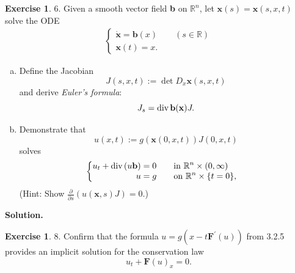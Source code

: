 \message{ !name(PDE-hw6-21935004-\unexpanded{谭焱}.tex)}\documentclass[a4paper]{book}
\newenvironment{solution}%
{\noindent\textbf{Solution.}}%
{\qedhere}
\numberwithin{equation}{chapter}
\theoremstyle{definition}
\newtheorem{exc}[exm]{Exercise}
\begin{document}
\begin{exc}
  6.  Given a smooth vector field \textbf{b} on $\mathbb{R}^n$, let $\mathbf{x}(s) = \mathbf{x}(s,x,t)$ solve the ODE
  \begin{eqnarray} \nonumber
    \begin{cases}
      \dot{\mathbf{x}} = \mathbf{b}(x) \qquad (s \in \mathbb{R}) \\
      \mathbf{x}(t) = x.
    \end{cases}
  \end{eqnarray}
  \begin{enumerate}[(a)]
  \item Define the Jacobian
    \begin{equation}
      \label{eq:6:5:1}
      J(s,x,t) := \det D_x\mathbf{x}(s,x,t)
    \end{equation}
    and derive \textit{Euler's formula}:
    \begin{equation}
      \label{eq:6:5:2}
      J_s = \textmd{div}\, \mathbf{b(x)}J.
    \end{equation}

  \item Demonstrate that
    \begin{equation}
      \label{eq:6:5:3}
      u(x,t) := g(\mathbf{x}(0,x,t))J(0,x,t)
    \end{equation}
    solves
    \begin{eqnarray}
      \label{eq:6:5:4}
      \begin{cases}
        \begin{aligned}
        u_t + \textmd{div}\,(u\mathbf{b}) &= 0 \qquad \textmd{in } \mathbb{R}^n \times (0,\infty) \\
        u &= g \qquad \textmd{on } \mathbb{R}^n \times \{t = 0\},
        \end{aligned}
      \end{cases}
    \end{eqnarray}
    (Hint: Show $\frac{\partial}{\partial s}(u(\mathbf{x},s)J) = 0$.)
  \end{enumerate}
\end{exc}

\begin{solution}
  
\end{solution}

\begin{exc}
  8.  Confirm that the formula $u = g(x - t \mathbf{F}^\prime (u))$ from 3.2.5 provides an implicit solution for the conservation law
  \begin{equation}
    \label{eq:6:6:1}
    u_t + \mathbf{F}(u)_x = 0.
  \end{equation}
\end{exc}
\end{document}
